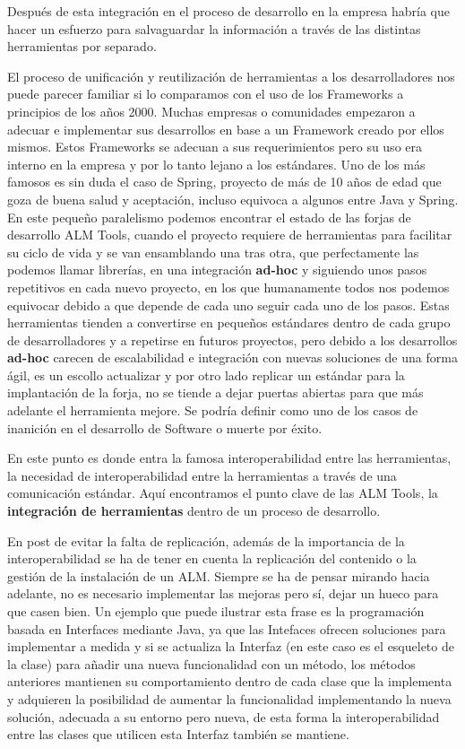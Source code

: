 \par Después de esta integración en el proceso de desarrollo en la empresa habría que hacer un esfuerzo para salvaguardar la información a través de las distintas herramientas por separado.

\par El proceso de unificación y reutilización de herramientas a los desarrolladores nos puede parecer familiar si lo comparamos con el uso de los Frameworks a principios de los años 2000. Muchas empresas o comunidades empezaron a adecuar e implementar sus desarrollos en base a un Framework creado por ellos mismos. Estos Frameworks se adecuan a sus requerimientos pero su uso era interno en la empresa y por lo tanto lejano a los estándares. Uno de los más famosos es sin duda el caso de Spring, proyecto de más de 10 años de edad que goza de buena salud y aceptación, incluso equivoca a algunos entre Java y Spring. En este pequeño paralelismo podemos encontrar el estado de las forjas de desarrollo ALM Tools, cuando el proyecto requiere de herramientas para facilitar su ciclo de vida y se van ensamblando una tras otra, que perfectamente las podemos llamar librerías, en una integración \textbf{ad-hoc} y siguiendo unos pasos repetitivos en cada nuevo proyecto, en los que humanamente todos nos podemos equivocar debido a que depende de cada uno seguir cada uno de los pasos. Estas herramientas tienden a convertirse en pequeños estándares dentro de cada grupo de desarrolladores y a repetirse en futuros proyectos, pero debido a los desarrollos \textbf{ad-hoc} carecen de escalabilidad e integración con nuevas soluciones de una forma ágil, es un escollo actualizar y por otro lado replicar un estándar para la implantación de la forja, no se tiende a dejar puertas abiertas para que más adelante el herramienta mejore. Se podría definir como uno de los casos de inanición en el desarrollo de Software o muerte por éxito.

\par En este punto es donde entra la famosa interoperabilidad entre las herramientas, la necesidad de interoperabilidad entre la herramientas a través de una comunicación estándar. Aquí encontramos el punto clave de las ALM Tools, la \textbf{integración de herramientas} dentro de un proceso de desarrollo.

\par En post de evitar la falta de replicación, además de la importancia de la interoperabilidad se ha de tener en cuenta la replicación del contenido o la gestión de la instalación de un ALM. Siempre se ha de pensar mirando hacia adelante, no es necesario implementar las mejoras pero sí, dejar un hueco para que casen bien. Un ejemplo que puede ilustrar esta frase es la programación basada en Interfaces mediante Java, ya que las Intefaces ofrecen soluciones para implementar a medida y si se actualiza la Interfaz (en este caso es el esqueleto de la clase) para añadir una nueva funcionalidad con un método, los métodos anteriores mantienen su comportamiento dentro de cada clase que la implementa y adquieren la posibilidad de aumentar la funcionalidad implementando la nueva solución, adecuada a su entorno pero nueva, de esta forma la interoperabilidad entre las clases que utilicen esta Interfaz también se mantiene.

